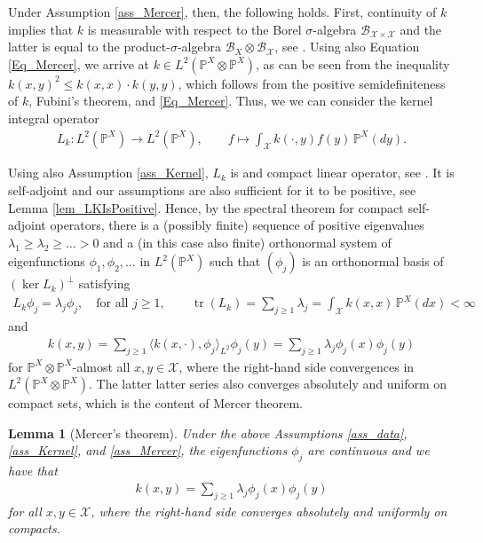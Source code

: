 \documentclass[a4paper,11pt]{article} %
\numberwithin{equation}{section}
\theoremstyle{definition}
\theoremstyle{remark}
\theoremstyle{plain}
\newtheorem{lemma}[definition]{Lemma}
\begin{document}
Under Assumption \ref{ass_Mercer}, then, the following holds. 
First, continuity of $k$ implies that $k$ is measurable with respect to the Borel $\sigma$-algebra $\mathscr{B}_{ \mathcal{X} \times \mathcal{X}} $ and the latter is equal to the product-$\sigma$-algebra $\mathscr{B}_X \otimes \mathscr{B}_{\mathcal{X}} $, see \cite[Proposition 4.1.7]{Dudley2002RealAnalysisAndProbability}.
Using also Equation \eqref{Eq_Mercer}, we arrive at $k \in L^2(\mathbb{P}^X \otimes \mathbb{P}^X)$, as can be seen from the inequality $ k(x,y)^2 \leq k(x,x)\cdot k(y,y) $, which follows from the positive semidefiniteness of \( k \), Fubini’s theorem, and \eqref{Eq_Mercer}.
Thus, we we can consider the kernel integral operator
\begin{align}
  L_k: L^{2}(\mathbb{P}^X) \to     L^{2}(\mathbb{P}^X), \qquad 
                         f \mapsto \int_{\mathcal{X}} k(\cdot, y) f(y) \, \mathbb{P}^X(dy).
\end{align}

Using also Assumption \ref{ass_Kernel}, $ L_k $ is and compact linear operator, see \cite[Theorem 4.2.16]{D07}.
It is self-adjoint and our assumptions are also sufficient for it to be positive, see Lemma \ref{lem_LKIsPositive}.
Hence, by the spectral theorem for compact self-adjoint operators, there is a (possibly finite) sequence of positive eigenvalues $\lambda_1 \ge \lambda_2 \ge \dots >0$ and a (in this case also finite) orthonormal system of eigenfunctions $ \phi_1,\phi_2, \dots $ in $L^2(\mathbb{P}^X)$ such that $(\phi_j)$ is an orthonormal basis of $(\operatorname{ker} L_k)^\perp$ satisfying
\begin{align}
  L_{k} \phi_j = \lambda_j \phi_j, \quad \text{for all } j \ge 1, 
  \qquad 
  \operatorname{tr}(L_{k}) = \sum_{j \ge 1} \lambda_j 
                           = \int_\mathcal{X} k(x,x) \, \mathbb{P}^X(dx) 
                           < \infty
\end{align}
and
\begin{align}
  k(x,y) 
  =
  \sum_{j \ge 1} \langle k(x, \cdot), \phi_{j} \rangle_{L^{2}} \phi_{j}(y)
  = 
  \sum_{j \ge 1} \lambda_j \phi_j(x) \phi_j(y)
\end{align}
for $ \mathbb{P}^X \otimes \mathbb{P}^X $-almost all $ x, y \in \mathcal{X} $, where the right-hand side convergences in $L^2(\mathbb{P}^X \otimes \mathbb{P}^X) $.
The latter latter series also converges absolutely and uniform on compact sets, which is the content of Mercer theorem.
\begin{lemma}[Mercer’s theorem]
  \label{lem_Mercer}
  Under the above Assumptions \ref{ass_data}, \ref{ass_Kernel}, and \ref{ass_Mercer}, the eigenfunctions \( \phi_{j} \) are continuous and we have that
  \begin{align}\label{eq_Mercer}
    k(x,y) = \sum_{j \ge 1} \lambda_j \phi_j(x) \phi_j(y)
  \end{align}
  for all $x,y\in\mathcal{X}$, where the right-hand side converges absolutely and uniformly on compacts.
\end{lemma}
\end{document}

